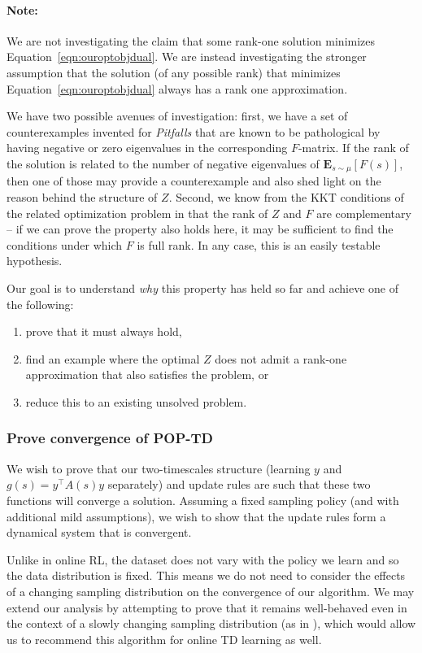 \documentclass[11pt]{article}
\newcommand{\E}{\textbf{E}}
\begin{document}
\paragraph{Note:}
We are not investigating the claim that some rank-one solution minimizes Equation~\ref{eqn:ouroptobjdual}. We are instead investigating the stronger assumption that the solution (of any possible rank) that minimizes Equation~\ref{eqn:ouroptobjdual} always has a rank one approximation.

We have two possible avenues of investigation: first, we have a set of counterexamples invented for \emph{Pitfalls} \cite{manek2022pitfalls} that are known to be pathological by having negative or zero eigenvalues in the corresponding $F$-matrix. If the rank of the solution is related to the number of negative eigenvalues of $\E_{s\sim\mu} [F(s)]$, then one of those may provide a counterexample and also shed light on the reason behind the structure of $Z$. Second, we know from the KKT conditions of the related optimization problem in \cite{kolter2011fixed} that the rank of $Z$ and $F$ are complementary -- if we can prove the property also holds here, it may be sufficient to find the conditions under which $F$ is full rank. In any case, this is an easily testable hypothesis.

Our goal is to understand \emph{why} this property has held so far and achieve one of the following:
\begin{enumerate}
  \item prove that it must always hold,
  \item find an example where the optimal $Z$ does not admit a rank-one approximation that also satisfies the problem, or
  \item reduce this to an existing unsolved problem.
\end{enumerate}

\subsubsection{Prove convergence of POP-TD}

We wish to prove that our two-timescales structure (learning $y$ and $g(s) = y^\top A(s) y$ separately) and update rules are such that these two functions will converge a solution. Assuming a fixed sampling policy (and with additional mild assumptions), we wish to show that the update rules form a dynamical system that is convergent.

Unlike in online RL, the dataset does not vary with the policy we learn and so the data distribution is fixed. This means we do not need to consider the effects of a changing sampling distribution on the convergence of our algorithm. We may extend our analysis by attempting to prove that it remains well-behaved even in the context of a slowly changing sampling distribution (as in \cite{zhang2021breaking}), which would allow us to recommend this algorithm for online TD learning as well.
\end{document}
